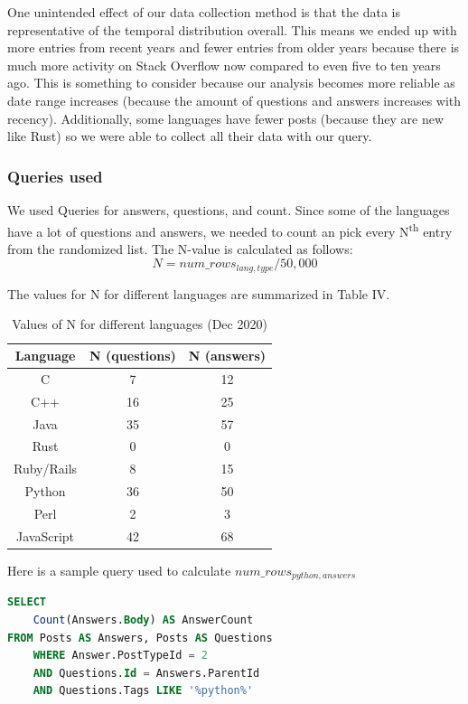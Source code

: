 \documentclass[conference]{IEEEtran}
\begin{document}
One unintended effect of our data collection method is that the data is representative of the temporal distribution overall. This means we ended up with more entries from recent years and fewer entries from older years because there is much more activity on Stack Overflow now compared to even five to ten years ago. This is something to consider because our analysis becomes more reliable as date range increases (because the amount of questions and answers increases with recency). Additionally, some languages have fewer posts (because they are new like Rust) so we were able to collect all their data with our query.\\

\subsubsection{Queries used}
We used Queries for answers, questions, and count. Since some of the languages have a lot of questions and answers, we needed to count an pick every N\textsuperscript{th} entry from the randomized list. The N-value is calculated as follows:
\begin{equation}
    N = num\_rows_{lang, type} / 50,000
\end{equation}

The values for N for different languages are summarized in Table IV.
\begin{table}[htbp]
\caption{Values of N for different languages (Dec 2020)}
\begin{center}
\begin{tabular}{|c|c|c|}
\hline
\textbf{Language}&\textbf{N (questions)}& \textbf{N (answers)}\\
\hline
C&7&12\\
\hline
C++&16&25\\
\hline
Java&35&57\\
\hline
Rust&0&0\\
\hline
Ruby/Rails&8&15\\
\hline
Python&36&50\\
\hline
Perl&2&3\\
\hline
JavaScript&42&68\\
\hline
\end{tabular}
\label{tab1}
\end{center}
\end{table}

Here is a sample query used to calculate $num\_rows_{python, answers}$

\begin{lstlisting}[language=SQL]
SELECT
    Count(Answers.Body) AS AnswerCount
FROM Posts AS Answers, Posts AS Questions
    WHERE Answer.PostTypeId = 2
    AND Questions.Id = Answers.ParentId
    AND Questions.Tags LIKE '%python%'
\end{lstlisting}
\end{document}
